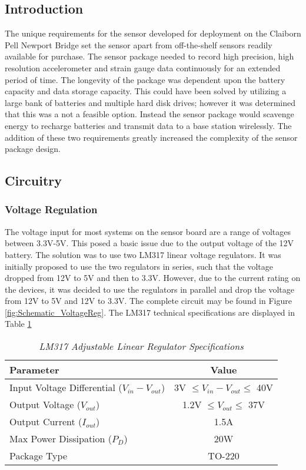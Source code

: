 \subsection{Introduction}
\indent The unique requirements for the sensor developed for deployment on the Claiborn Pell Newport Bridge set the sensor apart from off-the-shelf sensors readily available for purchase.
The sensor package needed to record high precision, high resolution accelerometer and strain gauge data continuously for an extended period of time. 
The longevity of the package was dependent upon the battery capacity and data storage capacity. 
This could have been solved by utilizing a large bank of batteries and multiple hard disk drives; however it was determined that this was a not a feasible option. 
Instead the sensor package would scavenge energy to recharge batteries and transmit data to a base station wirelessly. 
The addition of these two requirements greatly increased the complexity of the sensor package design. \\

\indent 

\subsection{Circuitry}

\subsubsection{Voltage Regulation}
The voltage input for most systems on the sensor board are a range of voltages between 3.3V-5V.
This posed a basic issue due to the output voltage of the 12V battery. 
The solution was to use two LM317 linear voltage regulators.
It was initially proposed to use the two regulators in series, such that the voltage dropped from 12V to 5V and then to 3.3V.
However, due to the current rating on the devices, it was decided to use the regulators in parallel and drop the voltage from 12V to 5V and 12V to 3.3V.
The complete circuit may be found in Figure \ref{fig:Schematic_VoltageReg}.
The LM317 technical specifications are displayed in Table \ref{tab:LM317} 

\begin{table}[h]
\centering
\begin{tabular}{|l|c|}
\hline
\textbf{Parameter} & \textbf{Value}\\
\hline
Input Voltage Differential ($V_{in}-V_{out}$)& 3V $\le V_{in}-V_{out} \le$ 40V\\
Output Voltage ($V_{out}$) & 1.2V $\le V_{out} \le$ 37V\\
Output Current ($I_{out}$) & 1.5A\\
Max Power Dissipation ($P_{D}$) & 20W\\
Package Type				   & TO-220\\
\hline
\end{tabular}
\caption{\textit{LM317 Adjustable Linear Regulator Specifications}}
\label{tab:LM317}
\end{table}


